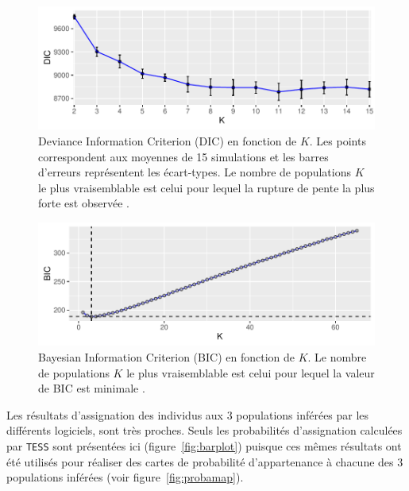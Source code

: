 \documentclass[a4paper,12pt,twoside]{article}\usepackage[]{graphicx}\usepackage[]{color}
\makeatletter
\def\maxwidth{ %
  \ifdim\Gin@nat@width>\linewidth
    \linewidth
  \else
    \Gin@nat@width
  \fi
}
\makeatother
\begin{document}
\begin{figure}[htpb]

{\centering \includegraphics[width=\maxwidth]{figure/dic-1} 

}

\caption[Deviance Information Criterion (DIC) en fonction de $K$.]{Deviance Information Criterion (DIC) en fonction de $K$. Les points correspondent aux moyennes de 15 simulations et les barres d'erreurs représentent les écart-types. Le nombre de populations $K$ le plus vraisemblable est celui pour lequel la rupture de pente la plus forte est observée \citep{durand2009}.}\label{fig:dic}
\end{figure}




\begin{figure}[htpb]

{\centering \includegraphics[width=\maxwidth]{figure/bic-1} 

}

\caption[Bayesian Information Criterion (BIC) en fonction de $K$.]{Bayesian Information Criterion (BIC) en fonction de $K$. Le nombre de populations $K$ le plus vraisemblable est celui pour lequel la valeur de BIC est minimale \citep{jombart2008}.}\label{fig:bic}
\end{figure}



Les résultats d'assignation des individus aux 3 populations inférées par les différents logiciels, sont très proches. Seuls les probabilités d'assignation calculées par \texttt{TESS} sont présentées ici (figure~\ref{fig:barplot}) puisque ces mêmes résultats ont été utilisés pour réaliser des cartes de probabilité d'appartenance à chacune des 3 populations inférées (voir figure~\ref{fig:probamap}).
\end{document}
